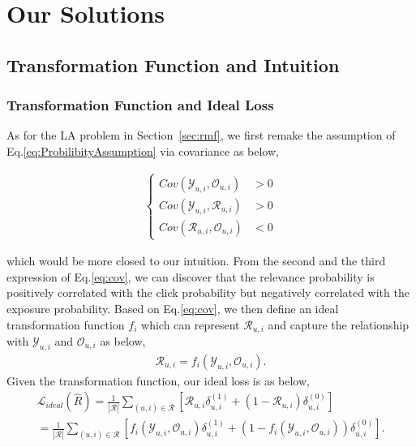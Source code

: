 \documentclass[sigconf]{acmart}
\begin{document}
\section{Our Solutions}
\subsection{Transformation Function and Intuition}
\subsubsection{Transformation Function and Ideal Loss}
As for the LA problem in Section~\ref{sec:rmf}, we first remake the assumption of Eq.\eqref{eq:ProbilibityAssumption} via covariance as below,

\begin{eqnarray}\label{eq:cov}
	\left\{
	\begin{aligned}
		Cov \left(	\mathcal{Y}_{u,i}, \mathcal{O}_{u,i}\right) &> 0 \\
		Cov \left(	\mathcal{Y}_{u,i},  \mathcal{R}_{u,i}\right) &> 0 \\
		Cov \left(	\mathcal{R}_{u,i}, \mathcal{O}_{u,i}\right) &< 0
	\end{aligned}
	\right.
\end{eqnarray}

which would be more closed to our intuition. From the second and the third expression of Eq.\eqref{eq:cov}, we can discover that the relevance probability is positively correlated with the click probability but negatively correlated with the exposure probability. Based on Eq.\eqref{eq:cov}, we then define an ideal transformation function $f_{i}$ which can represent $\mathcal{R}_{u,i}$ and capture the relationship with $\mathcal{Y}_{u,i}$ and  $\mathcal{O}_{u,i}$ as below,
\begin{eqnarray}\label{eq:transformationfunction}
	\mathcal{R}_{u,i} = f_{i} \left(\mathcal{Y}_{u,i}, \mathcal{O}_{u,i}\right) .
\end{eqnarray}
Given the transformation function, our ideal loss is as below, 
\begin{equation}\label{eq:idealLossTransformationFunction}
	\begin{aligned}
		\mathcal{L}_{ideal}(\hat{R})  =  \frac{1}{|\mathcal{R}|} \sum_{(u, i) \in \mathcal{R}}^{} \left[\mathcal{R}_{u,i} \delta_{u, i}^{(1)} +\left(1 - \mathcal{R}_{u,i}\right)\delta_{u, i}^{(0)} \right] \\
		 =  \frac{1}{|\mathcal{R}|} \sum_{(u, i) \in \mathcal{R}}^{} \left[f_{i}\left(\mathcal{Y}_{u,i}, \mathcal{O}_{u,i}\right) \delta_{u, i}^{(1)} + \left(1 -f_{i}\left(\mathcal{Y}_{u,i}, \mathcal{O}_{u,i}\right)\right)\delta_{u, i}^{(0)} \right].
	\end{aligned}
\end{equation}
\end{document}
